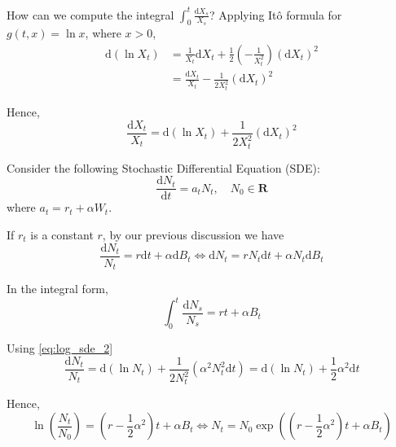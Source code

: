 \begin{example}
    How can we compute the integral $\int_0^t \frac{\mathrm{d} X_s}{X_s}$? Applying Itô formula for $g(t, x) = \ln x$, where $x > 0$,
    \begin{equation*}\label{eq:log_sde}
        \begin{aligned}
            \mathrm{d}(\ln X_t) &= \frac{1}{X_t} \mathrm{d}X_t + \frac{1}{2} \left( - \frac{1}{X_t^2} \right) (\mathrm{d}X_t)^2 \\
            &= \frac{\mathrm{d} X_t}{X_t} - \frac{1}{2 X_t^2} (\mathrm{d}X_t)^2
        \end{aligned}
    \end{equation*}

    Hence,
    \begin{equation}\label{eq:log_sde_2}
        \frac{\mathrm{d} X_t}{X_t} = \mathrm{d}(\ln X_t) + \frac{1}{2 X_t^2} (\mathrm{d}X_t)^2
    \end{equation}
\end{example}

\begin{example}\label{ex:pop-growth}
    Consider the following Stochastic Differential Equation (SDE):
    \[
        \frac{\mathrm{d} N_t}{\mathrm{d}t} = a_t N_t, \quad N_0 \in \textbf{R}
    \]
    where $a_t = r_t + \alpha W_t$. 

    If $r_t$ is a constant $r$, by our previous discussion we have
    \begin{equation*}
        \frac{\mathrm{d} N_t}{N_t} = r \mathrm{d}t + \alpha \mathrm{d}B_t \iff \mathrm{d}N_t = rN_t \mathrm{d}t + \alpha N_t \mathrm{d} B_t
    \end{equation*}

    In the integral form,
    \begin{equation*}
        \int_0^t \frac{\mathrm{d} N_s}{N_s} = rt + \alpha B_t
    \end{equation*}

    Using \eqref{eq:log_sde_2}
    \begin{equation*}
        \frac{\mathrm{d} N_t}{N_t} = \mathrm{d}(\ln N_t) + \frac{1}{2 N_t^2} \left( \alpha^2 N_t^2 \mathrm{d}t \right) = \mathrm{d}(\ln N_t) + \frac{1}{2}\alpha^2 \mathrm{d}t
    \end{equation*}

    Hence, 
    \begin{equation*}
        \ln \left( \frac{N_t}{N_0} \right) = \left( r - \frac{1}{2} \alpha^2 \right)t + \alpha B_t \iff N_t = N_0 \exp \left( \left( r - \frac{1}{2}\alpha^2 \right) t + \alpha B_t \right)
    \end{equation*}
\end{example}

